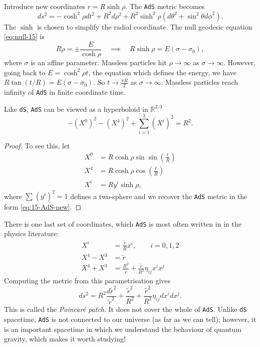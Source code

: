 Introduce new coordinates $r = R\sinh \rho$. The \texttt{AdS} metric becomes
\begin{equation}
  \label{eq:15-AdS-new}
  ds^2 = -\cosh^2\rho dt^2 + R^2 d\rho^2 + R^2 \sinh^2\rho (d\theta^2 + \sin^2\theta d\phi^2).
\end{equation}
The $\sinh$ is chosen to simplify the radial coordinate.
The null geodesic equation \eqref{eq:null-15} is
\begin{equation}
  R \dot{\rho} = \pm \frac{E}{\cosh\rho} \quad\implies\quad R \sinh\rho = E (\sigma - \sigma_0),
\end{equation}
where $\sigma$ is an affine parameter.
Massless particles hit $\rho \to \infty$ as $\sigma \to \infty$.
However, going back to $E = \cosh^2\rho \dot{t}$, the equation which defines the energy, we have $R \tan(t/R) = E (\sigma - \sigma_0)$.
So $t \to \frac{\pi R}{2}$ as $\sigma \to \infty$. Massless particles reach infinity of \texttt{AdS} in finite coordinate time.
\begin{claim}
  Like \texttt{dS}, \texttt{AdS} can be viewed as a hyperboloid in $\mathbb{R}^{2, 3}$
  \begin{equation}
    -(X^0)^2 - (X^4)^2 + \sum_{i=1}^{3}(X^{i})^2 = R^2.
  \end{equation}
\end{claim}
\begin{proof}
  To see this, let
  \begin{subequations}
    \begin{align}
      X^0 &= R \cosh \rho \sin \sin(\frac{t}{R}) \\
      X^4 &= R \cosh \rho \cos(\frac{t}{R}) \\
      X^{i} &= R y^{i} \sinh\rho,
    \end{align}
  \end{subequations}
  where $\sum_{}^{} (y^{i})^2 = 1$ defines a two-sphere and we recover the \texttt{AdS} metric in the form \eqref{eq:15-AdS-new}. 
\end{proof}
There is one last set of coordinates, which \texttt{AdS} is most often written in in the physics literature:
\begin{subequations}
  \begin{align}
    X^{i} &= \frac{\widetilde{r}}{R} x^{i}, \qquad i = 0,1,2   \\
    X^4 - X^3 &= \widetilde{r} \\
    X^4 + X^3 &= \frac{R^2}{\widetilde{r}} + \frac{\widetilde{r}}{R^2} \eta_{ij} x^{i} x^{j}
  \end{align}
\end{subequations}
Computing the metric from this parametrisation gives
\begin{equation}
  ds^2 = R^2 \frac{d\widetilde{r}^2}{\widetilde{r}^2} + \frac{\widetilde{r}^2}{R^2} + \frac{\widetilde{r}^2}{R^2} \eta_{ij} dx^{i} dx^{j}.
\end{equation}
This is called the \emph{Poincar\'e patch}. It does not cover the whole of \texttt{AdS}. 
Unlike \texttt{dS} spacetime, \texttt{AdS} is not connected to our universe (as far as we can tell); however, it is an important spacetime in which we understand the behaviour of quantum gravity, which makes it worth studying!

